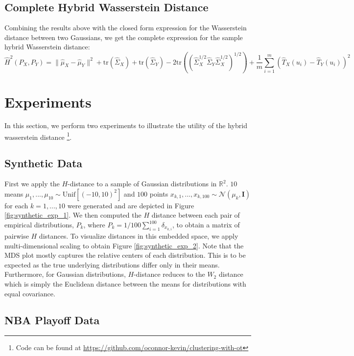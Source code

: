 \documentclass[11pt, a4paper, fleqn]{article}
\numberwithin{equation}{section}
\numberwithin{figure}{section}
\numberwithin{table}{section}
\begin{document}
\subsection{Complete Hybrid Wasserstein Distance}
Combining the results above with the closed form expression for the Wasserstein distance between two Gaussians, we get the complete expression for the sample hybrid Wasserstein distance:
\begin{equation}
\hat{H}^2(P_X, P_Y) = \| \hat{\mu}_X - \hat{\mu}_Y\|^2 + \mbox{tr}(\hat{\Sigma}_X) + \mbox{tr}(\hat{\Sigma}_Y) - 2\mbox{tr}((\hat{\Sigma}_X^{1/2} \hat{\Sigma}_Y \hat{\Sigma}_X^{1/2})^{1/2}) + \frac{1}{m} \sum\limits_{i=1}^m (\hat{T}_X(u_i) - \hat{T}_Y(u_i))^2
\end{equation}


\section{Experiments}\label{sec:experiments}
In this section, we perform two experiments to illustrate the utility of the hybrid wasserstein distance \footnote{Code can be found at \url{https://github.com/oconnor-kevin/clustering-with-ot}}.
\subsection{Synthetic Data}
First we apply the $H$-distance to a sample of Gaussian distributions in $\mathbb{R}^2$. $10$ means $\mu_1, ..., \mu_{10} \sim \mbox{Unif}[(-10, 10)^2]$ and $100$ points $x_{k,1}, ..., x_{k,100} \sim \mathcal{N}(\mu_k, \mathbf{I})$ for each $k = 1, ..., 10$ were generated and are depicted in Figure \ref{fig:synthetic_exp_1}. We then computed the $H$ distance between each pair of empirical distributions, $P_k$, where $P_k = 1/100  \sum_{i=1}^{100} \delta_{x_{k, i}}$, to obtain a matrix of pairwise $H$ distances. To visualize distances in this embedded space, we apply multi-dimensional scaling to obtain Figure \ref{fig:synthetic_exp_2}.  Note that the MDS plot mostly captures the relative centers of each distribution. This is to be expected as the true underlying distributions differ only in their means. Furthermore, for Gaussian distributions, $H$-distance reduces to the $W_2$ distance which is simply the Euclidean distance between the means for distributions with equal covariance.

\subsection{NBA Playoff Data}
\end{document}
